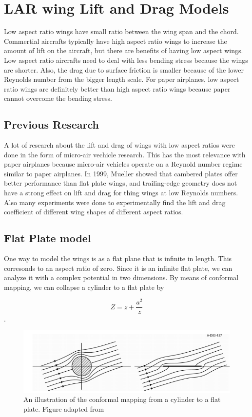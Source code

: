 
\section{LAR wing Lift and Drag Models}

Low aspect ratio wings have small ratio between the wing span and
the chord. Commertial aircrafts typically have high aspect ratio wings
to increase the amount of lift on the aircraft, but there are benefits of having
low aspect wings. Low aspect ratio aircrafts need to deal with less bending
stress because the wings are shorter. Also, the drag due to surface friction is
smaller because of the lower Reynolds number from the bigger length scale.
For paper airplanes, low aspect ratio wings are definitely better than high
aspect ratio wings because paper cannot overcome the bending stress.


\subsection{Previous Research}

A lot of research about the lift and drag of wings with low aspect ratios  were done in the form of
micro-air vechicle research. This has the most relevance with paper airplanes because
micro-air vehicles operate on a Reynold number regime similar to paper airplanes. 
In 1999, Mueller showed that cambered plates offer better performance than flat plate wings, and
trailing-edge geometry does not have a strong effect on lift and drag
for thing wings at low Reynolds numbers. Also many experiments were done to experimentally
find the lift and drag coefficient of different wing shapes of different aspect ratios.

\subsection{Flat Plate model}

One way to model the wings is as a flat plane that is infinite in length. This corresonds to
an aspect ratio of zero. Since it is
an infinite flat plate, we can analyze it with a complex potential in two dimensions.
By means of conformal mapping, we can collapse a cylinder to a flat plate by

\[Z = z + \frac{a^2}{z}\].

\begin{figure}[hl]
  \centering
    \includegraphics[scale=.5]{figures/flatplate1.png}
    \caption{An illustration of the conformal mapping from a cylinder to a flat plate. Figure adapted from ~\cite{thintheory}}
  \label{fig:dihedraleffect}
\end{figure}

